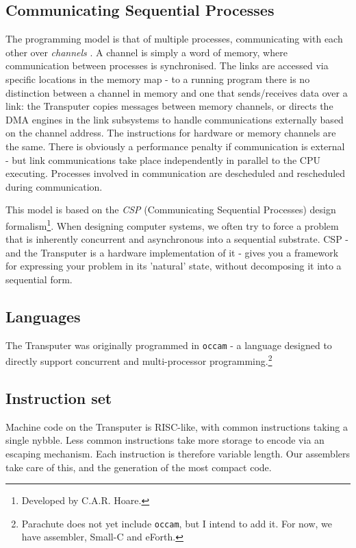 \documentclass[a4paper]{tufte-book}
\begin{document}
\subsection{Communicating Sequential Processes}
The programming model is that of multiple processes, communicating with each other over \textit{channels} . A channel is simply a word of memory, where communication between processes is synchronised. The links are accessed via specific locations in the memory map - to a running program there is no distinction between a channel in memory and one that sends/receives data over a link: the Transputer copies messages between memory channels, or directs the DMA engines in the link subsystems to handle communications externally based on the channel address. The instructions for hardware or memory channels are the same. There is obviously a performance penalty if communication is external - but link communications take place independently in parallel to the CPU executing. Processes involved in communication are descheduled and rescheduled during communication.

This model is based on the  \textit{CSP} (Communicating Sequential Processes) design formalism\footnote{Developed by C.A.R. Hoare.}. When designing computer systems, we often try to force a problem that is inherently concurrent and asynchronous into a sequential substrate. CSP - and the Transputer is a hardware implementation of it - gives you a framework for expressing your problem in its 'natural' state, without decomposing it into a sequential form.

\subsection{Languages}
The Transputer was originally programmed in \texttt{occam}  - a language designed to directly support concurrent and multi-processor programming.\footnote{Parachute does not yet include \texttt{occam}, but I intend to add it. For now, we have assembler, Small-C and eForth.}

\subsection{Instruction set}
Machine code on the Transputer is RISC-like, with common instructions taking a single nybble. Less common instructions take more storage to encode via an escaping mechanism. Each instruction is therefore variable length. Our assemblers take care of this, and the generation of the most compact code.
\end{document}
